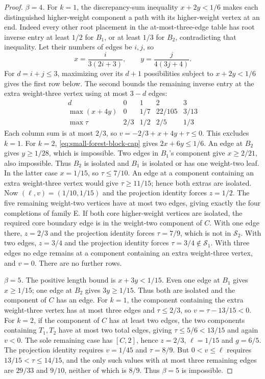 \documentclass[11pt,reqno]{amsart}
\theoremstyle{definition}
\theoremstyle{remark}
\numberwithin{equation}{section}
\begin{document}
\begin{proof}
\emph{$\beta=4$.}
For $k=1$, the discrepancy-sum inequality $x+2y<1/6$ makes each distinguished higher-weight
component a path with its higher-weight vertex at an end. Indeed every other
root placement in the at-most-three-edge table has root inverse entry at least
$1/2$ for $B_1$, or at least $1/3$ for $B_2$, contradicting that inequality.
Let their numbers of edges be $i,j$, so
\[
 x=\frac{i}{3(2i+3)},\qquad y=\frac{j}{4(3j+4)}.
\]
For $d=i+j\le3$, maximizing over its $d+1$ possibilities subject to
$x+2y<1/6$ gives the first row below. The second bounds the remaining
inverse entry at the extra weight-three vertex using at most $3-d$ edges:
\[
\begin{array}{c|cccc}
 d&0&1&2&3\\\hline
 \max(x+4y)&0&1/7&22/105&3/13\\
 \max\tau&2/3&1/2&2/5&1/3
\end{array}
\]
Each column sum is at most $2/3$, so
$v=-2/3+x+4y+\tau\le0$. This excludes $k=1$.
For $k=2$, \eqref{eq:small-forest-block-cap} gives $2x+6y\le1/6$.
An edge at $B_2$ gives $y\ge1/28$, which is impossible.
Two edges in $B_1$'s component give $x\ge2/21$, also impossible.
Thus $B_2$ is isolated and $B_1$ is isolated or has one weight-two leaf.
In the latter case $x=1/15$, so $\tau\le7/10$.
An edge at a component containing an extra weight-three vertex would give $\tau\ge11/15$;
hence both extras are isolated. Now $(\ell,v)=(1/10,1/15)$ and the
projection identity forces $z=1/2$. The five remaining weight-two vertices
have at most two edges, giving exactly the four completions of family E.
If both core higher-weight vertices are isolated, the required core boundary
edge is in the weight-two component of $C$.
With one edge there, $z=2/3$ and the projection identity forces $\tau=7/9$, which is not
in $\mathcal S_2$. With two edges, $z=3/4$ and the projection identity forces
$\tau=3/4\notin\mathcal S_1$.
With three edges no edge remains at a component containing an extra weight-three vertex, and
$v=0$. There are no further rows.

\emph{$\beta=5$.}
The positive length bound is $x+3y<1/15$.
Even one edge at $B_1$ gives $x\ge1/15$; one edge at $B_2$ gives
$3y\ge1/15$. Thus both are isolated and the component of $C$ has an edge.
For $k=1$, the component containing the extra weight-three vertex has at most three edges and
$\tau\le2/3$, so $v=\tau-13/15<0$.
For $k=2$, if the component of $C$ has at least two edges, the two components containing $T_1,T_2$ have at most two total edges, giving
$\tau\le5/6<13/15$ and again $v<0$.
The sole remaining case has $[C,2]$, hence $z=2/3$, $\ell=1/15$ and
$g=6/5$. The projection identity requires $v=1/45$ and $\tau=8/9$.
But $0<v\le\ell$ requires $13/15<\tau\le14/15$, and the only such
values with at most three remaining edges are $29/33$ and $9/10$,
neither of which is $8/9$. Thus $\beta=5$ is impossible.


\end{proof}
\end{document}
